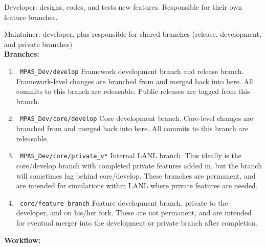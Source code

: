 \documentclass[11pt]{article}
\begin{document}
Developer: designs, codes, and tests new features.  Responsible for their own feature branches.

Maintainer: developer, plus responsible for shared branches (release, development, and private branches)\\

{\bf Branches:}
\begin{enumerate}
\item \verb| MPAS_Dev/develop|  Framework development branch and release branch.  Framework-level changes are branched from and merged back into here.   All commits to this branch are releasable.  Public releases are tagged from this branch.

\item \verb| MPAS_Dev/core/develop|  Core development branch.  Core-level changes are branched from and merged back into here.  All commits to this branch are releasable.

\item \verb| MPAS_Dev/core/private_v*|  Internal LANL branch.  This ideally is the core/develop branch with completed private features added in, but the branch will sometimes lag behind core/develop.  These branches are permanent, and are intended for simulations within LANL where private features are needed.

\item \verb| core/feature_branch|  Feature development branch, private to the developer, and on his/her fork.  These are not permanent, and are intended for eventual merger into the development or private branch after completion.
\end{enumerate}

{\bf Workflow:}
\end{document}
